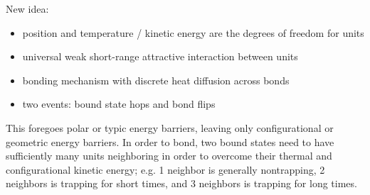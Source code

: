 \documentclass[12pt,letterpaper]{article}
\begin{document}
New idea:
\begin{itemize}
\item position and temperature / kinetic energy are the degrees of freedom for units
\item universal weak short-range attractive interaction between units
\item bonding mechanism with discrete heat diffusion across bonds
\item two events: bound state hops and bond flips
\end{itemize}
This foregoes polar or typic energy barriers, leaving only configurational or geometric energy barriers. In order to bond, two bound states need to have sufficiently many units neighboring in order to overcome their thermal and configurational kinetic energy; e.g. 1 neighbor is generally nontrapping, 2 neighbors is trapping for short times, and 3 neighbors is trapping for long times.
\end{document}
